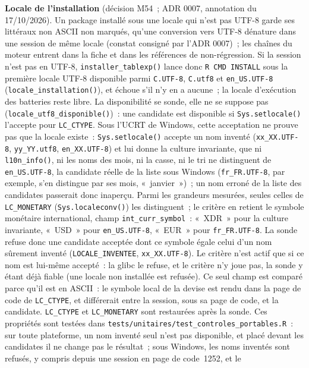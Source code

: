 \documentclass[a4paper,11pt]{article}
\newcommand{\code}[1]{\texttt{\small #1}}
\begin{document}
\noindent
\textbf{Locale de l'installation} (décision M54~; ADR 0007, annotation du
17/10/2026). Un package installé sous une locale qui n'est pas UTF-8 garde ses
littéraux non ASCII non marqués, qu'une conversion vers UTF-8 dénature dans
une session de même locale (constat consigné par l'ADR 0007)~; les chaînes du
moteur entrent dans la fiche et dans les références de non-régression. Si la
session n'est pas en UTF-8, \code{installer\_tablexp()} lance donc
\code{R CMD INSTALL} sous la première locale UTF-8 disponible parmi
\code{C.UTF-8}, \code{C.utf8} et \code{en\_US.UTF-8}
(\code{locale\_installation()}), et échoue s'il n'y en a aucune~; la locale
d'exécution des batteries reste libre. La disponibilité se sonde, elle ne
se suppose pas (\code{locale\_utf8\_disponible()})~: une candidate est
disponible si \code{Sys.setlocale()} l'accepte pour \code{LC\_CTYPE}. Sous
l'UCRT de Windows, cette acceptation ne prouve pas que la locale existe~:
\code{Sys.setlocale()} accepte un nom inventé (\code{xx\_XX.UTF-8},
\code{yy\_YY.utf8}, \code{en\_XX.UTF-8}) et lui donne la culture
invariante, que ni \code{l10n\_info()}, ni les noms des mois, ni la casse,
ni le tri ne distinguent de \code{en\_US.UTF-8}, la candidate réelle de la
liste sous Windows (\code{fr\_FR.UTF-8}, par exemple, s'en distingue par ses
mois, «~janvier~»)~; un nom erroné de la liste des candidates passerait
donc inaperçu. Parmi les grandeurs mesurées, seules celles de
\code{LC\_MONETARY} (\code{Sys.localeconv()}) les distinguent~; le critère
en retient le symbole monétaire international, champ
\code{int\_curr\_symbol}~: «~XDR~» pour la culture
invariante, «~USD~» pour \code{en\_US.UTF-8}, «~EUR~» pour
\code{fr\_FR.UTF-8}. La sonde refuse donc une candidate acceptée dont ce
symbole égale celui d'un nom sûrement inventé (\code{LOCALE\_INVENTEE},
\code{xx\_XX.UTF-8}). Le critère n'est actif que si ce nom est lui-même
accepté~: la glibc le refuse, et le critère n'y joue pas, la sonde y étant
déjà fiable (une locale non installée est refusée). Ce seul champ est
comparé parce qu'il est en ASCII~: le symbole local de la devise est rendu
dans la page de code de \code{LC\_CTYPE}, et différerait entre la session,
sous sa page de code, et la candidate. \code{LC\_CTYPE} et
\code{LC\_MONETARY} sont restaurées après la sonde. Ces propriétés sont
testées dans \code{tests/unitaires/test\_controles\_portables.R}~: sur toute
plateforme, un nom inventé seul n'est pas disponible, et placé devant les
candidates il ne change pas le résultat~; sous Windows, les noms inventés
sont refusés, y compris depuis une session en page de code~1252, et le
\end{document}
